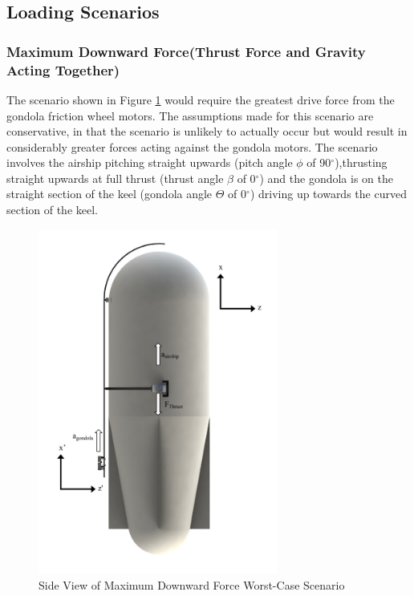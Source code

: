 \documentclass[../main.tex]{subfiles}
\begin{document}
\subsection{Loading Scenarios} \label{loadingScenarios}
\subsubsection*{Maximum Downward Force(Thrust Force and Gravity Acting Together)}
The scenario shown in Figure \ref{fig:scenario1} would require the greatest drive force from the gondola friction wheel motors. The assumptions made for this scenario are conservative, in that the scenario is unlikely to actually occur but would result in considerably greater forces acting against the gondola motors. The scenario involves the airship pitching straight upwards (pitch angle $\phi$ of 90$^{\circ}$),thrusting straight upwards at full thrust (thrust angle $\beta$ of 0$^{\circ}$) and the gondola is on the straight section of the keel (gondola angle $\Theta$ of 0$^{\circ}$) driving up towards the curved section of the keel.

\begin{figure}[H]
	\centering
	\includegraphics[width=0.7\textwidth]{img/analysis/scenario1.pdf}
	\caption{Side View of Maximum Downward Force Worst-Case Scenario}
	\label{fig:scenario1}
\end{figure}
\end{document}
